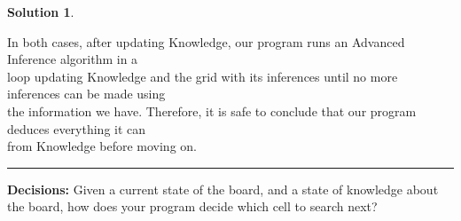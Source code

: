 \documentclass{article}
\theoremstyle{definition}
\def\fline{\rule{0.75\linewidth}{0.5pt}}
\newcommand{\finishline}{\vspace{-15pt}\begin{center}\fline\end{center}}
\newtheorem*{solution*}{Solution}
\newenvironment{solution}{\begin{solution*}}{{\finishline} \end{solution*}}
\begin{document}
\begin{solution}
\begin{tabbing}
    \>In both cases, after updating Knowledge, our program runs an Advanced Inference algorithm in a\\ \>loop updating Knowledge and the grid with its inferences until no more inferences can be made using\\ \> the information we have. Therefore, it is safe to conclude that our program deduces everything it can\\ \> from Knowledge before moving on.\\
	\end{tabbing}
\end{solution}

\smallskip

\textbf{Decisions:}
	Given a current state of the board, and a state of knowledge about the board, how does your program decide which cell to search next? 
\end{document}
